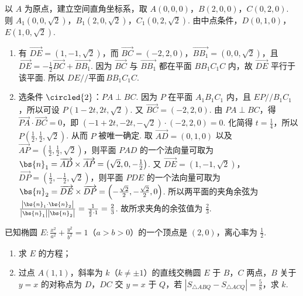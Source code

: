 \begin{solution}
以 \(A\) 为原点，建立空间直角坐标系，取 \( A\left( 0,0,0 \right) \)，\( B\left( 2,0,0 \right) \)，\( C\left( 0,2,0 \right) \). 则 \( A_1\left( 0,0,\sqrt{2} \right) \)，\( B_1\left( 2,0,\sqrt{2} \right) \)，\( C_1\left( 0,2,\sqrt{2} \right) \). 由中点条件，\( D\left( 0,1,0 \right) \)，\( E\left( 1,0,\sqrt{2} \right) \).

\begin{enumerate}
\item 有 \( \overrightarrow{DE}=\left( 1,-1,\sqrt{2} \right) \)，而 \( \overrightarrow{BC}=\left( -2,2,0 \right) \)，\( \overrightarrow{BB_1}=\left( 0,0,\sqrt{2} \right) \)，且 \( \overrightarrow{DE}=-\frac{1}{2}\overrightarrow{BC}+\overrightarrow{BB_1} \).
因为 \( \overrightarrow{BC} \) 与 \( \overrightarrow{BB_1} \) 都在平面 \(BB_1C_1C\) 内，故 \( \overrightarrow{DE} \) 平行于该平面. 所以 \( DE // \text{平面}\, BB_1C_1C \).

\item 选条件 \(\circled{2}\)：\( PA\perp BC \).
因为 \(P\) 在平面 \(A_1B_1C_1\) 内，且 \( EP//B_1C_1 \)，所以可设 \( P\left( 1-2t,2t,\sqrt{2} \right) \). 又 \( \overrightarrow{BC}=\left( -2,2,0 \right) \). 由 \( PA\perp BC \)，得 \( \overrightarrow{PA}\cdot \overrightarrow{BC}=0 \)，即 \( \left( -1+2t,-2t,-\sqrt{2} \right)\cdot \left( -2,2,0 \right)=0 \). 化简得 \( t=\frac{1}{4} \)，所以 \( P\left( \frac{1}{2},\frac{1}{2},\sqrt{2} \right) \).
从而 \(P\) 被唯一确定.
取 \( \overrightarrow{AD}=\left( 0,1,0 \right) \) 以及 \( \overrightarrow{AP}=\left( \frac{1}{2},\frac{1}{2},\sqrt{2} \right) \)，则平面 \(PAD\) 的一个法向量可取为 \( \bs{n}_1=\overrightarrow{AD}\times \overrightarrow{AP}=\left( \sqrt{2},0,-\frac{1}{2} \right) \).
又 \( \overrightarrow{DE}=\left( 1,-1,\sqrt{2} \right) \)，\( \overrightarrow{DP}=\left( \frac{1}{2},-\frac{1}{2},\sqrt{2} \right) \)，则平面 \(PDE\) 的一个法向量可取为 \( \bs{n}_2=\overrightarrow{DE}\times \overrightarrow{DP}=\left( -\frac{\sqrt{2}}{2},-\frac{\sqrt{2}}{2},0 \right) \). 所以两平面的夹角余弦为 \( \frac{\left| \bs{n}_1\cdot \bs{n}_2 \right|}{\left| \bs{n}_1 \right|\left| \bs{n}_2 \right|}=\frac{1}{\frac{3}{2}\cdot 1}=\frac{2}{3} \).
故所求夹角的余弦值为 \( \frac{2}{3} \).
\end{enumerate}
\end{solution}

\begin{problem}
已知椭圆 \( E:\frac{x^2}{a^2}+\frac{y^2}{b^2}=1 \)（\( a>b>0 \)）的一个顶点是 \( \left( 2,0 \right) \)，离心率为 \( \frac{1}{2} \).

\begin{enumerate}
\item 求 \(E\) 的方程；
\item 过点 \( A\left( 1,1 \right) \)，斜率为 \( k \)（\( k\neq \pm 1 \)）的直线交椭圆 \(E\) 于 \(B\)，\(C\) 两点，\(B\) 关于 \( y=x \) 的对称点为 \(D\)，\(DC\) 交 \( y=x \) 于 \(Q\)，若 \( \left| S_{\triangle ABQ}-S_{\triangle ACQ} \right|=\frac{5}{8} \)，求 \( k \).
\end{enumerate}
\end{problem}

